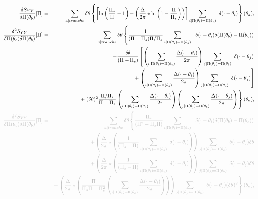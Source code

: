 	\begin{eqnarray}
			\frac{ \delta S_{YY} }{ \delta \Pi(\theta_b)} [\Pi ]  & = & \sum_{a\vert tranche}   \delta \theta \left \{ \left [ \ln \left ( \frac{ \Pi_s }{ \Pi} - 1 \right ) -  \left ( \frac{ \Delta}{2 \pi} \star \ln \left ( 1 - \frac{ \Pi}{ \Pi_s}\right )  \right)  \right ]\sum_{i\vert \Pi(\theta_i) = \Pi(\theta_b)}  \delta ( \cdot  - \theta_i )  \right \} ( \theta_	a ),\\
			\frac{ \delta^2 S_{YY} }{ \delta \Pi(\theta_c) \delta \Pi(\theta_b)  } [\Pi ]  & = & \sum_{a \vert tranche}   \delta \theta \left \{  \frac{1}{(\Pi  - \Pi_s)\Pi/\Pi_s} \sum_{i\vert \Pi(\theta_i) = \Pi(\theta_b)}   \delta ( \cdot  - \theta_i )	\delta (  \Pi(\theta_b)  - \Pi(\theta_c) ) \right . \\
			&  &  -   \frac{\delta \theta }{(\Pi -\Pi_s) } \left [ \left (  \sum_{i \vert \Pi(\theta_i) = \Pi(\theta_c)}\frac{\Delta ( \cdot - \theta_i )}{2\pi}   \right )   \sum_{j\vert \Pi(\theta_j) = \Pi(\theta_b)}  \delta ( \cdot  - \theta_j ) \right. \\
			& &  \quad + \left . \left (  \sum_{i \vert \Pi(\theta_i) = \Pi(\theta_b)}\frac{\Delta ( \cdot - \theta_i )}{2\pi} \right )\sum_{j\vert \Pi(\theta_j) = \Pi(\theta_c)}  \delta ( \cdot  - \theta_j )    \right ] \\
		& & + \left . (\delta \theta)^2  \frac{\Pi/\Pi_s }{\Pi - \Pi_s }\left ( \sum_{i \vert \Pi(\theta_i) = \Pi(\theta_c)}\frac{\Delta ( \cdot - \theta_i )}{2\pi}\right )\left (  \sum_{j \vert \Pi(\theta_j) = \Pi(\theta_b)}\frac{\Delta ( \cdot - \theta_j )}{2\pi} \right )    \right \}(\theta_a),	\\
			\color{lightgray}\frac{ \delta^2 S_{YY} }{ \delta \Pi(\theta_c) \delta \Pi(\theta_b)  } [\Pi ]  & \color{lightgray}= & \color{lightgray}\sum_{a \vert tranche}   \delta \theta \left \{  \frac{\Pi_s}{(\Pi^2  - \Pi_s\Pi)} \sum_{i\vert \Pi(\theta_i) = \Pi(\theta_b)}   \delta ( \cdot  - \theta_i )	\delta (  \Pi(\theta_b)  - \Pi(\theta_c) ) \right . \\
		&  &  \color{lightgray}+   \left (  \frac{\Delta}{2\pi} \star \left ( \frac{1 }{(\Pi_s -\Pi) }  \sum_{i\vert \Pi(\theta_i) = \Pi(\theta_b)}  \delta ( \cdot  - \theta_i )   \right )   \right ) \sum_{j\vert \Pi(\theta_j) = \Pi(\theta_c)}  \delta ( \cdot  - \theta_j )  \delta \theta \\
		& & \color{lightgray}+   \left (  \frac{\Delta}{2\pi} \star \left ( \frac{1 }{(\Pi_s -\Pi) }  \sum_{i\vert \Pi(\theta_i) = \Pi(\theta_c)}  \delta ( \cdot  - \theta_i )   \right )   \right ) \sum_{j\vert \Pi(\theta_j) = \Pi(\theta_b)}  \delta ( \cdot  - \theta_j )  \delta \theta \\
		& & \color{lightgray}+ \left .  \left (  \frac{\Delta}{2\pi} \star \left ( \frac{\Pi }{\Pi_s\Pi - \Pi_s^2 }\left (  \sum_{i \vert \Pi(\theta_i) = \Pi(\theta_c)}\frac{\Delta ( \cdot - \theta_i )}{2\pi}\right )\right ) \right ) \sum_{j\vert \Pi(\theta_j) = \Pi(\theta_b)}  \delta ( \cdot  - \theta_j ) (\delta \theta)^2  \right \}(\theta_a),	
	\end{eqnarray}
	
